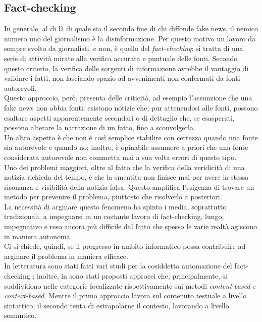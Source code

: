 \documentclass[12pt]{report}
\theoremstyle{definition}
\begin{document}
\subsection{Fact-checking} \label{factchecking}
In generale, al di là di quale sia il secondo fine di chi diffonde fake news, il nemico numero uno del giornalismo è la disinformazione.
Per questo motivo un lavoro da sempre svolto da giornalisti, e non, è quello del \textit{fact-checking}: si tratta di una serie di attività mirate alla verifica accurata e puntuale delle fonti.
Secondo questo criterio, la verifica delle sorgenti di informazione avrebbe il vantaggio di validare i fatti, non lasciando spazio ad avvenimenti non confermati da fonti autorevoli.
\\
Questo approccio, però, presenta delle criticità, ad esempio l'assunzione che una fake news non abbia fonti: esistono notizie che, pur attenendosi alle fonti, possono esaltare aspetti apparentemente secondari o di dettaglio che, se esasperati, possono alterare la narrazione di un fatto, fino a sconvolgerla.
\\
Un altro aspetto è che non è così semplice stabilire con certezza quando una fonte sia autorevole e quando no; inoltre, è opinabile assumere a priori che una fonte considerata autorevole non commetta mai a sua volta errori di questo tipo.
\\
Uno dei problemi maggiori, oltre al fatto che la verifica della veridicità di una notizia richieda del tempo, è che la smentita non finisce mai per avere la stessa risonanza e visibilità della notizia falsa. Questo amplifica l'esigenza di trovare un metodo per prevenire il problema, piuttosto che risolverlo a posteriori.
\\
La necessità di arginare questo fenomeno ha spinto i media, soprattutto tradizionali, a impegnarsi in un costante lavoro di fact-checking, lungo, impegnativo e reso ancora più difficile dal fatto che spesso le varie realtà agiscono in maniera autonoma.
\\
Ci si chiede, quindi, se il progresso in ambito informatico possa contribuire ad arginare il problema in maniera efficace.
\\
In letteratura sono stati fatti vari studi per la cosiddetta automazione del fact-checking \cite{5, 6, 8, 9, 10, 11}; inoltre, in \cite{15, 16, 21} sono stati proposti approcci che, principalmente, si suddividono nelle categorie focalizzate rispettivamente sui metodi \textit{content-based} e \textit{context-based}.
Mentre il primo approccio lavora sul contenuto testuale a livello sintattico, il secondo tenta di estrapolarne il contesto, lavorando a livello semantico.
\end{document}
